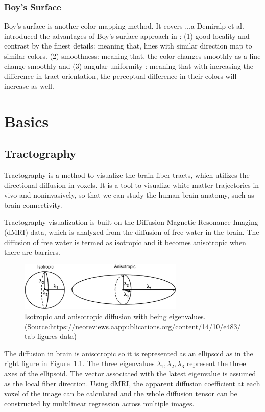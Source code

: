 \documentclass[hyperref, plainreport, noproblem]{cgvpub1}
\begin{document}
\subsection{Boy’s Surface}  
Boy's surface is another color mapping method. It covers ...a
Demiralp et al. introduced the advantages of Boy’s surface approach in \cite{demiralp}: (1) good locality and contrast by the finest details: meaning that, lines with similar direction map to similar colors. (2) smoothness: meaning that, the color changes smoothly as a line change smoothly and (3) angular uniformity \cite{chen}: meaning that with increasing the difference in tract orientation, the perceptual difference in their colors will increase as well.


\chapter{Basics}

\section{Tractography}
Tractography is a method to visualize the brain fiber tracts, which utilizes the directional diffusion in voxels. It is a tool to visualize white matter trajectories in vivo and noninvasively, so that we can study the human brain anatomy, such as brain connectivity.

Tractography visualization is built on the Diffusion Magnetic Resonance Imaging (dMRI) data, which is analyzed from the diffusion of free water in the brain. The diffusion of free water is termed as isotropic and it becomes anisotropic when there are barriers. 

\begin{figure}[h]
	\centering
	\includegraphics[width=0.7\textwidth]{iso_ani_diff}
	\caption{Isotropic and anisotropic diffusion with  being eigenvalues. (Source:https://neoreviews.aappublications.org/content/14/10/e483/tab-figures-data)}
	\label{fig:iso_ani_diff}
\end{figure}

The diffusion in brain is anisotropic so it is represented as an ellipsoid as in the right figure in Figure~\ref{fig:iso_ani_diff}. The three eigenvalues  $\lambda_1, \lambda_2, \lambda_3$ represent the three axes of the ellipsoid. The vector associated with the latest eigenvalue is assumed as the local fiber direction.\cite{tak}
Using dMRI, the apparent diffusion coefficient at each voxel of the image can be calculated and the whole diffusion tensor can be constructed by multilinear regression across multiple images.
\end{document}
